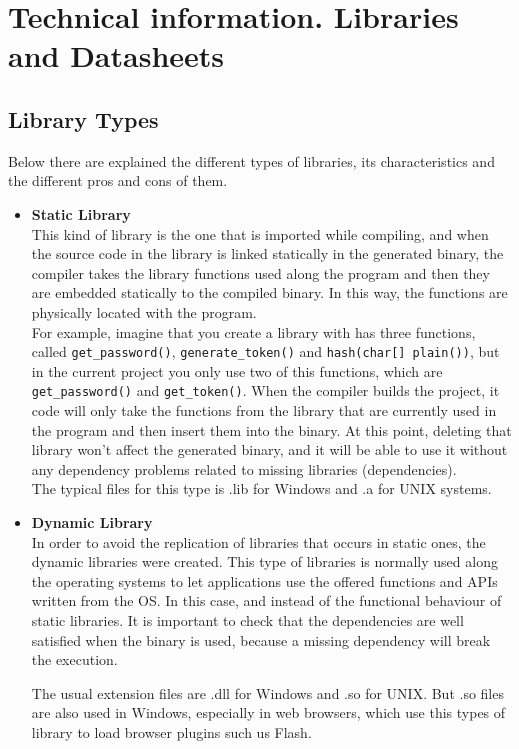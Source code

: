 \chapter{Technical information. Libraries and Datasheets}\label{C:Libraries-Datasheets}
\section{Library Types}\label{S:appendices-libraries-types}
Below there are explained the different types of libraries, its characteristics and the different pros and cons of them.
\begin{itemize}
  \item 
  \textbf{Static Library}
  \\
  This kind of library is the one that is imported while compiling, and when the source code in the library is linked statically in the generated binary, the compiler takes the library functions used along the program and then they are embedded statically to the compiled binary. In this way, the functions are physically located with the program. 
\\
For example, imagine that you create a library with has three functions, called \verb!get_password()!, \verb!generate_token()! and \verb!hash(char[] plain())!,  but in the current project you only use two of this functions, which are \verb!get_password()! and \verb!get_token()!. When the compiler builds the project, it code will only take the functions from the library that are currently used in the program and then insert them into the binary. At this point, deleting that library won't affect the generated binary, and it will be able to use it without any dependency problems related to missing libraries (dependencies).
\\
The typical files for this type is .lib for Windows and .a for UNIX systems.
  
  \item
  \textbf{Dynamic Library}
  \\
  In order to avoid the replication of libraries that occurs in static ones, the dynamic libraries were created. This type of libraries is normally used along the operating systems to let applications use the offered functions and APIs written from the OS. In this case, and instead of the functional behaviour of static libraries. It is important to check that the dependencies are well satisfied when the binary is used, because a missing dependency will break the execution.

The usual extension files are .dll for Windows and .so for UNIX. But .so files are also used in Windows, especially in web browsers, which use this types of library to load browser plugins such us Flash.


\end{itemize}

